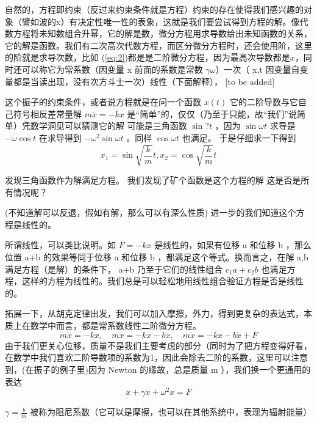 \documentclass[11pt]{book}
\begin{document}
自然的，方程即约束（反过来约束条件就是方程）约束的存在使得我们感兴趣的对象（譬如波的x）有决定性唯一性的表象，这就是我们要尝试得到方程的解。像代数方程将未知数组合升幂，它的解是数，微分方程用求导数给出未知函数的关系，它的解是函数。我们有二次高次代数方程，而区分微分方程时，还会使用阶，这里的阶就是求导次数，比如
(\ref{eq:2})都是是二阶微分方程，因为最高次导数都是\(\ddot{x}\)，同时还可以称它为常系数（因变量 x 前面的系数是常数 \(\gamma \omega\)）一次（ x,t 因变量自变量都是当读出现，没有次方斗士一次）线性（下面解释）， [to be added]

这个振子的约束条件，或者说方程就是在问一个函数 \(x(t)\) 它的二阶导数与它自己符号相反差常量解 \(m\ddot{x}=-kx\) 是“简单”的，仅仅（乃至于只能，故“我们”说简单）凭数学洞见可以猜测它的解
可能是三角函数 \(\sin ? t\) ，因为 \(\sin\omega t\) 求导是 \(-\omega\cos t\) 在求导得到 \(-\omega^2\sin \omega t\) 。同样 \(\cos \omega t\) 也满足。
于是仔细求一下得到
\begin{equation}
\label{eq:57}
x_1=\sin \sqrt{\frac{k}{m}}t,x_2=\cos \sqrt{\frac{k}{m}}t
\end{equation}

发现三角函数作为解满足方程。
我们发现了矿个函数是这个方程的解
这是否是所有情况呢？

(不知道解可以反退，假如有解，那么可以有深么性质)
进一步的我们知道这个方程是线性的。

所谓线性，可以类比说明。如 \(F=-kx\) 是线性的，如果有位移 a 和位移 b ，那么位置 a+b 的效果等同于位移 a 和位移 b ，都满足这个等式。换而言之，在解 a,b 满足方程（是解）的条件下， a+b 乃至于它们的线性组合 \(c_1a+c_2b\) 也满足方程，这样的方程为线性的。我们总是可以轻松地用线性组合验证方程是否是线性的。

拓展一下，从胡克定律出发，我们可以加入摩擦，外力，得到更复杂的表达式，本质上在数学中而言，都是常系数线性二阶微分方程。
\begin{equation}
\label{eq:2}
m\ddot{x}=-kx,\quad m\ddot{x}=-kx-b\dot{x},\quad m\ddot{x}=-kx-b\dot{x}+F
\end{equation}
由于我们更关心位移，质量不是我们主要考虑的部分（同时为了把方程变得好看，在数学中我们喜欢二阶导数项的系数为1，因此会除去二阶的系数，这里可以注意到，(在振子的例子里)因为 Newton 的缘故，总是质量 m ），我们换一个更通用的表达
\begin{equation}
\label{eq:39}
\ddot{x}+\gamma \dot{x}+\omega^{2} x=F
\end{equation}

\(\gamma=\frac{b}{m}\) 被称为阻尼系数（它可以是摩擦，也可以在其他系统中，表现为辐射能量）
\end{document}
